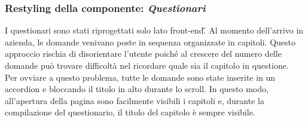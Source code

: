 \subsubsection{Restyling della componente: \textit{Questionari}}
I questionari sono stati riprogettati solo lato \gls{front-end}\G.
Al momento dell'arrivo in azienda, le domande venivano poste in sequenza organizzate in capitoli. Questo approccio rischia di disorientare l'utente poiché al crescere del numero delle domande può trovare difficoltà nel ricordare quale sia il capitolo in questione. \\
Per ovviare a questo problema, tutte le domande sono state inserite  in un accordion e bloccando il titolo in alto durante lo scroll. In questo modo, all'apertura della pagina sono facilmente visibili i capitoli e, durante la compilazione del questionario, il titolo del capitolo è sempre visibile.\\

